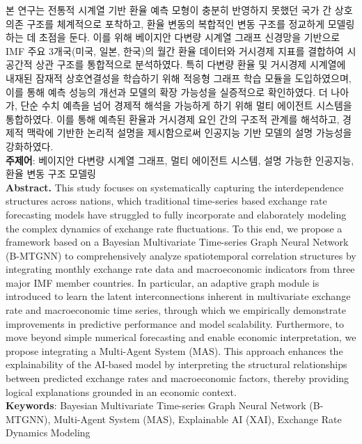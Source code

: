 \titlespacing*{\subsection}{0pt}{1.0em}{0.3em}
\titlespacing*{\paragraph}{0pt}{1.0em}{0.3em}

본 연구는 전통적 시계열 기반 환율 예측 모형이 충분히 반영하지 못했던 국가 간 상호의존 구조를 체계적으로 포착하고, 환율 변동의 복합적인 변동 구조를 정교하게 모델링하는 데 초점을 둔다. 이를 위해 베이지안 다변량 시계열 그래프 신경망을 기반으로 IMF 주요 3개국(미국, 일본, 한국)의 월간 환율 데이터와 거시경제 지표를 결합하여 시공간적 상관 구조를 통합적으로 분석하였다. 특히 다변량 환율 및 거시경제 시계열에 내재된 잠재적 상호연결성을 학습하기 위해 적응형 그래프 학습 모듈을 도입하였으며, 이를 통해 예측 성능의 개선과 모델의 확장 가능성을 실증적으로 확인하였다. 더 나아가, 단순 수치 예측을 넘어 경제적 해석을 가능하게 하기 위해 멀티 에이전트 시스템을 통합하였다. 이를 통해 예측된 환율과 거시경제 요인 간의 구조적 관계를 해석하고, 경제적 맥락에 기반한 논리적 설명을 제시함으로써 인공지능 기반 모델의 설명 가능성을 강화하였다.
\\[0.5em]
\textbf{주제어}: 베이지안 다변량 시계열 그래프, 멀티 에이전트 시스템, 설명 가능한 인공지능, 환율 변동 구조 모델링
\\[0.8em]
\textbf{Abstract.} This study focuses on systematically capturing the interdependence structures across nations, which traditional time-series based exchange rate forecasting models have struggled to fully incorporate and elaborately modeling the complex dynamics of exchange rate fluctuations. To this end, we propose a framework based on a Bayesian Multivariate Time-series Graph Neural Network (B-MTGNN) to comprehensively analyze spatiotemporal correlation structures by integrating monthly exchange rate data and macroeconomic indicators from three major IMF member countries. In particular, an adaptive graph module is introduced to learn the latent interconnections inherent in multivariate exchange rate and macroeconomic time series, through which we empirically demonstrate improvements in predictive performance and model scalability. Furthermore, to move beyond simple numerical forecasting and enable economic interpretation, we propose integrating a Multi-Agent System (MAS). This approach enhances the explainability of the AI-based model by interpreting the structural relationships between predicted exchange rates and macroeconomic factors, thereby providing logical explanations grounded in an economic context.
\\[0.5em]
\textbf{Keywords}: Bayesian Multivariate Time-series Graph Neural Network (B-MTGNN), Multi-Agent System (MAS), Explainable AI (XAI), Exchange Rate Dynamics Modeling
